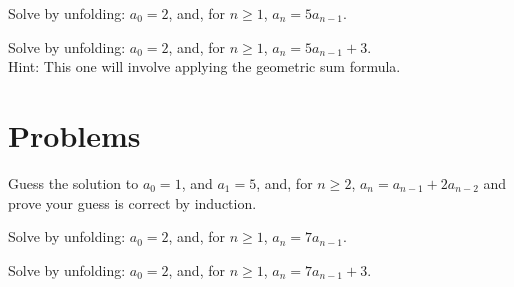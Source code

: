\begin{exer}
Solve by unfolding: $a_0 = 2$, and, for $n\geq 1$, $a_n = 5a_{n-1}$.
\end{exer}

\begin{exer}
Solve by unfolding:  $a_0 = 2$, and, for $n\geq 1$,  $a_n = 5a_{n-1}+ 3$.\\
Hint: This one will involve applying the  geometric sum formula.
\end{exer}

\section{Problems}

\begin{prob}
Guess the solution to $a_0=1$, and $a_1=5$, and, for $n\geq2$, $a_n = a_{n-1}+2a_{n-2}$
and prove your guess is correct by induction.
\end{prob}

\begin{prob}
Solve by unfolding: $a_0 = 2$, and, for $n\geq 1$, $a_n = 7a_{n-1}$.
\end{prob}

\begin{prob}
Solve by unfolding:  $a_0 = 2$, and, for $n\geq 1$,  $a_n = 7a_{n-1}+ 3$.
\end{prob}

